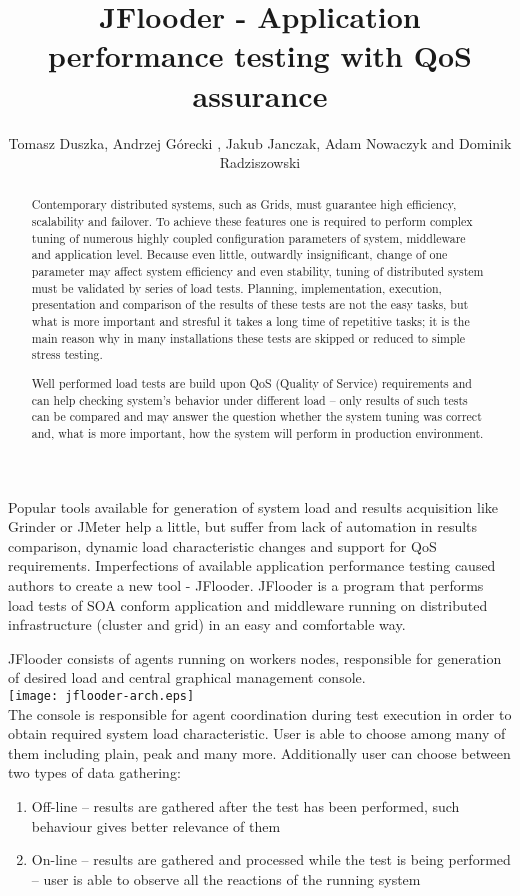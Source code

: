 \documentclass{article}
\title{JFlooder - Application performance testing with QoS assurance}
\author{Tomasz Duszka\inst{1}, 
		Andrzej Górecki\inst{1} , 
		Jakub Janczak\inst{1}, 
		Adam Nowaczyk\inst{1} 
		and Dominik Radziszowski\inst{1}
}
\institute{Institute of Computer Science, AGH UST, al. Mickiewicza 30, 30-059 Krakow, Poland}
\begin{document}
\maketitle

\begin{abstract}
Contemporary distributed systems, such as Grids, must guarantee high efficiency, scalability and failover.
To achieve these features one is required to perform complex tuning of numerous highly coupled configuration parameters of system, middleware and application level. 
Because even little, outwardly insignificant, change of one parameter may affect system efficiency and even stability, tuning of distributed system must be validated by series of load tests. 
Planning, implementation, execution, presentation and comparison of the results of these tests are not the easy tasks, but what is more important and stresful it takes a long time of repetitive tasks; it is the main reason why in many installations these tests are skipped or reduced to simple stress testing. 


Well performed load tests are build upon QoS (Quality of Service) requirements and can help checking system's behavior under different load – only results of such tests can be compared and may answer the question whether the system tuning was correct and, what is more important, how the system will perform in production environment. 
\end{abstract}

Popular tools available for generation of system load and results acquisition like Grinder or JMeter help a little, but suffer from lack of automation in results comparison, dynamic load characteristic changes and support for QoS requirements. 
Imperfections of available application performance testing caused authors to create a new tool - JFlooder. 
JFlooder is a program that performs load tests of SOA conform application and middleware running on distributed infrastructure (cluster and grid) in an easy and comfortable way. 

JFlooder consists of agents running on workers nodes, responsible for generation of desired load and central graphical management console. 
\\
\texttt{[image: jflooder-arch.eps]}
\\
The console is responsible for agent coordination during test execution in order to obtain required system load characteristic. User is able to choose among many of them including plain, peak and many more. Additionally user can choose between two types of data gathering:
\begin{enumerate}

\item{Off-line – results are gathered after the test has been performed, such behaviour gives better relevance of them}

\item{On-line – results are gathered and processed while the test is being performed – user is able to observe all the reactions of the running system}

\end{enumerate}
\end{document}
